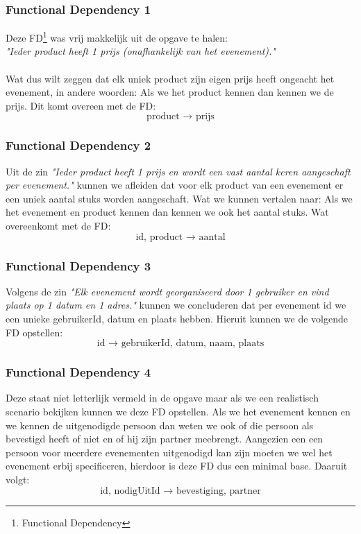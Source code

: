 \documentclass[a4paper]{article}
\begin{document}
\subsubsection{Functional Dependency 1}
Deze FD\footnote{Functional Dependency} was vrij makkelijk uit de opgave te halen: \\\emph{"Ieder product heeft 1 prijs (onafhankelijk van het evenement)."}\\\\
Wat dus wilt zeggen dat elk uniek product zijn eigen prijs heeft ongeacht het evenement, in andere woorden: Als we het product kennen dan kennen we de prijs. Dit komt overeen met de FD:
\[\text{product } \rightarrow \text{ prijs}\]

\subsubsection{Functional Dependency 2}
Uit de zin \emph{"Ieder product heeft 1 prijs en wordt een vast aantal keren aangeschaft per evenement."}
kunnen we afleiden dat voor elk product van een evenement er een uniek aantal stuks worden aangeschaft. Wat we kunnen vertalen naar: Als we het evenement en product kennen dan kennen we ook het aantal stuks. Wat overeenkomt met de FD:
\[\text{id, product } \rightarrow \text{ aantal}\]
\subsubsection{Functional Dependency 3}
Volgens de zin \emph{"Elk evenement wordt georganiseerd door 1 gebruiker en vind plaats op 1 datum en 1 adres."} kunnen we concluderen dat per evenement id we een unieke gebruikerId, datum en plaats hebben. Hieruit kunnen we de volgende FD opstellen:
\[\text{id } \rightarrow \text{ gebruikerId, datum, naam, plaats}\]

 \subsubsection{Functional Dependency 4}
 Deze staat niet letterlijk vermeld in de opgave maar als we een realistisch scenario bekijken kunnen we deze FD opstellen. Als we het evenement kennen en we kennen de uitgenodigde persoon dan weten we ook of die persoon als bevestigd heeft of niet en of hij zijn partner meebrengt. Aangezien een een persoon voor meerdere evenementen uitgenodigd kan zijn moeten we wel het evenement erbij specificeren, hierdoor is deze FD dus een minimal base. Daaruit volgt:
 \[\text{id, nodigUitId } \rightarrow \text{ bevestiging, partner}\]
\end{document}
